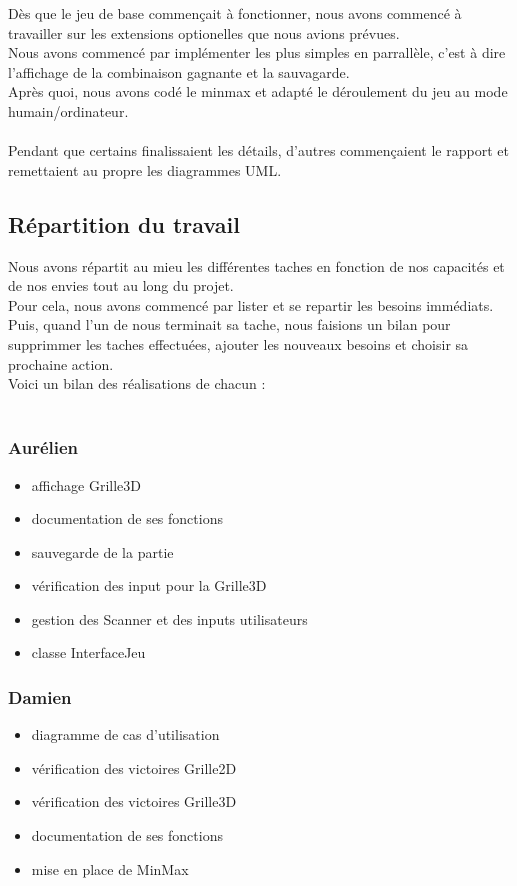 \documentclass{article}
\begin{document}
Dès que le jeu de base commençait à fonctionner, nous avons commencé à travailler sur les extensions optionelles que nous avions prévues.\\
Nous avons commencé par implémenter les plus simples en parrallèle, c'est à dire l'affichage de la combinaison gagnante et la sauvagarde.\\
Après quoi, nous avons codé le minmax et adapté le déroulement du jeu au mode humain/ordinateur.\\ \\

Pendant que certains finalissaient les détails, d'autres commençaient le rapport et remettaient au propre les diagrammes UML.\\


 
 \subsection{Répartition du travail}
Nous avons répartit au mieu les différentes taches en fonction de nos capacités et de nos envies tout au long du projet.\\
Pour cela, nous avons commencé par lister et se repartir les besoins immédiats. Puis, quand l'un de nous terminait sa tache, nous faisions un bilan pour supprimmer les taches effectuées, ajouter les nouveaux besoins et choisir sa prochaine action.\\
Voici un bilan des réalisations de chacun :\\ \\

\subsubsection{Aurélien}
 \begin{itemize}
    \item affichage Grille3D
    \item documentation de ses fonctions
    \item sauvegarde de la partie
    \item vérification des input pour la Grille3D
    \item gestion des Scanner et des inputs utilisateurs
    \item classe InterfaceJeu
\end{itemize}

\subsubsection{Damien}
 \begin{itemize}
    \item diagramme de cas d'utilisation
    \item vérification des victoires Grille2D
    \item vérification des victoires Grille3D
    \item documentation de ses fonctions
    \item mise en place de MinMax
\end{itemize}
\end{document}
